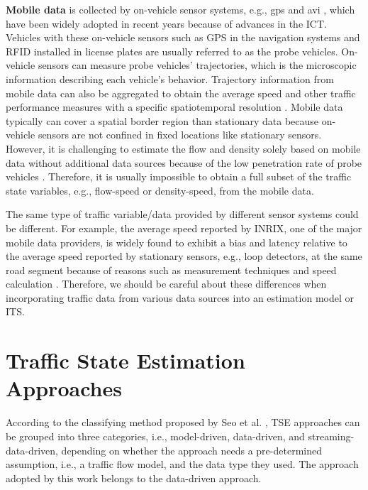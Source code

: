 \documentclass[english]{kththesis}
\begin{document}
\textbf{Mobile data} is collected by on-vehicle sensor systems, e.g., \gls{gps} and \gls{avi} \cite{seo_tse, tsanakas_emission_estimation, herrera_gps_mobile_century}, which have been widely adopted in recent years because of advances in the ICT. Vehicles with these on-vehicle sensors such as GPS in the navigation systems and RFID installed in license plates are usually referred to as the probe vehicles. On-vehicle sensors can measure probe vehicles' trajectories, which is the microscopic information describing each vehicle's behavior. Trajectory information from mobile data can also be aggregated to obtain the average speed and other traffic performance measures with a specific spatiotemporal resolution \cite{seo_tse, sharma_inrix_data_opportunity}. Mobile data typically can cover a spatial border region than stationary data because on-vehicle sensors are not confined in fixed locations like stationary sensors. However, it is challenging to estimate the flow and density solely based on mobile data without additional data sources because of the low penetration rate of probe vehicles \cite{tsanakas_emission_estimation}. Therefore, it is usually impossible to obtain a full subset of the traffic state variables, e.g., flow-speed or density-speed, from the mobile data. 

The same type of traffic variable/data provided by different sensor systems could be different. For example, the average speed reported by INRIX, one of the major mobile data providers, is widely found to exhibit a bias and latency relative to the average speed reported by stationary sensors, e.g., loop detectors, at the same road segment because of reasons such as measurement techniques and speed calculation \cite{sharma_inrix_data_opportunity, kim_inrix_data_comparing}. Therefore, we should be careful about these differences when incorporating traffic data from various data sources into an estimation model or ITS.

\section{Traffic State Estimation Approaches}
\label{sec:tseApproaches}
According to the classifying method proposed by Seo et al. \cite{seo_tse}, TSE approaches can be grouped into three categories, i.e., model-driven, data-driven, and streaming-data-driven, depending on whether the approach needs a pre-determined assumption, i.e., a traffic flow model, and the data type they used. The approach adopted by this work belongs to the data-driven approach.
\end{document}
